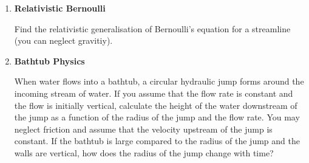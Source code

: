 \begin{enumerate}
\item{\bf Relativistic Bernoulli}

  Find the relativistic generalisation of Bernoulli's equation for a
  streamline (you can neglect gravitiy).

\item{\bf Bathtub Physics}

  When water flows into a bathtub, a circular hydraulic jump forms
  around the incoming stream of water.  If you assume that the flow
  rate is constant and the flow is initially vertical, calculate the
  height of the water downstream of the jump as a function of the
  radius of the jump and the flow rate.  You may neglect friction and
  assume that the velocity upstream of the jump is constant. If
  the bathtub is large compared to the radius of the jump and the
  walls are vertical, how does the radius of the jump change with
  time?
\end{enumerate}
